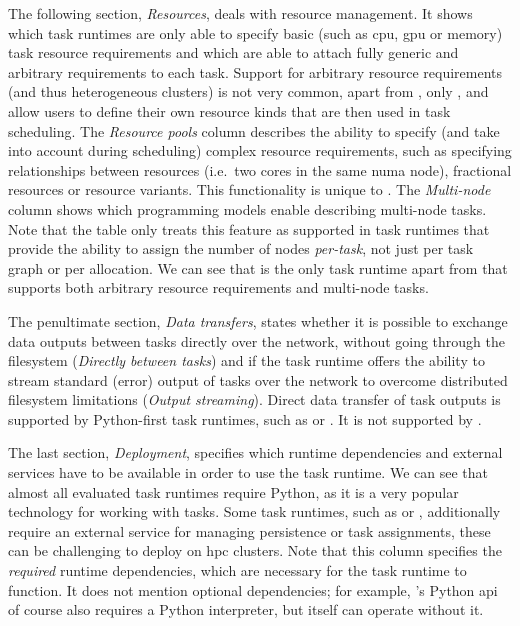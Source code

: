 The following section, \emph{Resources}, deals with resource management. It shows which task
runtimes are only able to specify basic (such as \gls{cpu}, \gls{gpu}
or memory) task resource requirements and which are able to attach fully generic and arbitrary
requirements to each task. Support for arbitrary resource requirements (and thus heterogeneous
clusters) is not very common, apart from \hyperqueue{}, only \dask{},
\ray{} and \snakemake{} allow users to define their own resource kinds
that are then used in task scheduling. The \emph{Resource pools} column describes the ability to
specify (and take into account during scheduling) complex resource requirements, such as specifying
relationships between resources (i.e.\ two cores in the same \gls{numa} node),
fractional resources or resource variants. This functionality is unique to \hyperqueue{}.
The \emph{Multi-node} column shows which programming models enable describing multi-node
tasks. Note that the table only treats this feature as supported in task runtimes that provide the
ability to assign the number of nodes \emph{per-task}, not just per task graph or per
allocation. We can see that \snakemake{} is the only task runtime apart from
\hyperqueue{} that supports both arbitrary resource requirements and multi-node tasks.

The penultimate section, \emph{Data transfers}, states whether it is possible to exchange data
outputs between tasks directly over the network, without going through the filesystem
(\emph{Directly between tasks}) and if the task runtime offers the ability to stream standard (error)
output of tasks over the network to overcome distributed filesystem limitations
(\emph{Output streaming}). Direct data transfer of task outputs is supported by Python-first task
runtimes, such as \dask{} or \ray{}. It is not supported by
\hyperqueue{}.

The last section, \emph{Deployment}, specifies which runtime dependencies and external
services have to be available in order to use the task runtime. We can see that almost all
evaluated task runtimes require Python, as it is a very popular technology for working with tasks.
Some task runtimes, such as \merlin{} or \fireworks{}, additionally
require an external service for managing persistence or task assignments, these can be challenging
to deploy on \gls{hpc} clusters. Note that this column specifies the
\emph{required} runtime dependencies, which are necessary for the task runtime to function.
It does not mention optional dependencies; for example, \hyperqueue{}'s Python
\gls{api} of course also requires a Python interpreter, but \hyperqueue{}
itself can operate without it.

